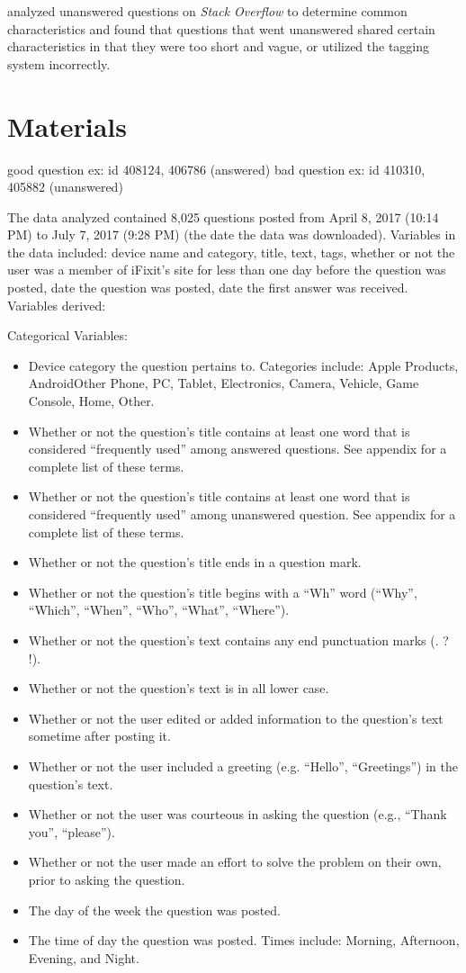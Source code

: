 \documentclass[12pt]{article}
\begin{document}
    \citep{Asaduzzaman2013} analyzed unanswered questions on \textit{Stack Overflow} to determine common characteristics and found that questions that went unanswered shared certain characteristics in that they were too short and vague, or utilized the tagging system incorrectly. 


\section{Materials}

good question ex: id 408124, 406786 (answered)
bad question ex: id 410310, 405882 (unanswered) 

The data analyzed contained 8,025 questions posted from April 8, 2017 (10:14 PM) to July 7, 2017 (9:28 PM) (the date the data was downloaded). Variables in the data included: device name and category, title, text, tags, whether or not the user was a member of iFixit's site for less than one day before the question was posted, date the question was posted, date the first answer was received. Variables derived: 

Categorical Variables: 

\begin{itemize}
  \item Device category the question pertains to. Categories include: Apple Products, Android\/Other Phone, PC, Tablet, Electronics, Camera, Vehicle, Game Console, Home, Other.
  \item Whether or not the question's title contains at least one word that is considered ``frequently used'' among answered questions. See appendix for a complete list of these terms. 
  \item Whether or not the question's title contains at least one word that is considered ``frequently used'' among unanswered question. See appendix for a complete list of these terms. 
  \item Whether or not the question's title ends in a question mark.
  \item Whether or not the question's title begins with a ``Wh'' word (``Why'', ``Which'', ``When'', ``Who'', ``What'', ``Where''). 
  \item Whether or not the question's text contains any end punctuation marks (. ? !). 
  \item Whether or not the question's text is in all lower case. 
  \item Whether or not the user edited or added information to the question's text sometime after posting it.
  \item Whether or not the user included a greeting (e.g. ``Hello'', ``Greetings'') in the question's text.
  \item Whether or not the user was courteous in asking the question (e.g., ``Thank you'', ``please'').
  \item Whether or not the user made an effort to solve the problem on their own, prior to asking the question.
  \item The day of the week the question was posted. 
  \item The time of day the question was posted. Times include: Morning, Afternoon, Evening, and Night. 
\end{itemize}
\end{document}
